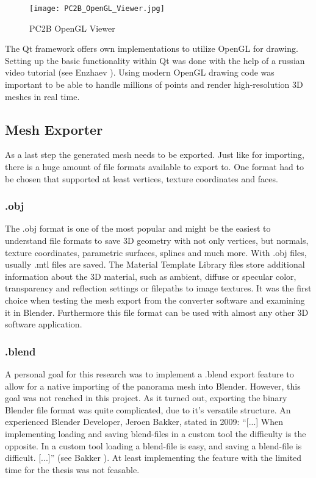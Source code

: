 \begin{figure}[h]
	\centering
	\texttt{[image: PC2B\_OpenGL\_Viewer.jpg]}
	\caption{PC2B OpenGL Viewer}
	\label{fig:pc2b_opengl_viewer}
\end{figure}

The Qt framework offers own implementations to utilize OpenGL for drawing. Setting up the basic functionality within Qt was done with the help of a russian video tutorial (see Enzhaev \parencite{ytQtOpenGL} ). Using modern OpenGL drawing code was important to be able to handle millions of points and render high-resolution 3D meshes in real time.


\subsection{Mesh Exporter}

As a last step the generated mesh needs to be exported. Just like for importing, there is a huge amount of file formats available to export to. One format had to be chosen that supported at least vertices, texture coordinates and faces.

\subsubsection{.obj}

The .obj format is one of the most popular and might be the easiest to understand file formats to save 3D geometry with not only vertices, but normals, texture coordinates, parametric surfaces, splines and much more. With .obj files, usually .mtl files are saved. The Material Template Library files store additional information about the 3D material, such as ambient, diffuse or specular color, transparency and reflection settings or filepaths to image textures. It was the first choice when testing the mesh export from the converter software and examining it in Blender. Furthermore this file format can be used with almost any other 3D software application.

\subsubsection{.blend}

A personal goal for this research was to implement a .blend export feature to allow for a native importing of the panorama mesh into Blender. However, this goal was not reached in this project. As it turned out, exporting the binary Blender file format was quite complicated, due to it's versatile structure. An experienced Blender Developer, Jeroen Bakker, stated in 2009: “[...] When implementing loading and saving blend-files in a custom tool the difficulty is the opposite. In a custom tool loading a blend-file is easy, and saving a blend-file is difficult. [...]” (see Bakker \parencite{webMysteryOfTheBlend}). At least implementing the feature with the limited time for the thesis was not feasable.

